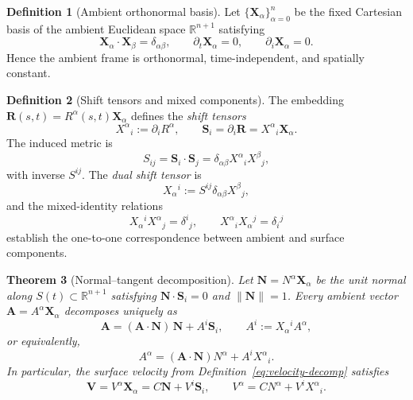 \documentclass[11pt]{article}
\theoremstyle{definition}
\newtheorem{definition}{Definition}[section]
\theoremstyle{plain}
\newtheorem{theorem}[definition]{Theorem}
\theoremstyle{remark}
\begin{document}
\begin{definition}[Ambient orthonormal basis]\label{def:ambient-basis}
Let $\{\mathbf{X}_{\alpha}\}_{\alpha=0}^{n}$ be the fixed Cartesian basis of the ambient Euclidean space $\mathbb{R}^{n+1}$ satisfying
\begin{equation}
\mathbf{X}_{\alpha} \cdot \mathbf{X}_{\beta}=\delta_{\alpha\beta},\qquad
\partial_t\mathbf{X}_{\alpha}=0,\qquad
\partial_i\mathbf{X}_{\alpha}=0.
\end{equation}
Hence the ambient frame is orthonormal, time-independent, and spatially constant.
\end{definition}

\begin{definition}[Shift tensors and mixed components]\label{def:shift-tensors}
The embedding $\mathbf{R}(s,t)=R^{\alpha}(s,t)\mathbf{X}_{\alpha}$ defines the \emph{shift tensors}
\begin{equation}
X^{\alpha}{}_{i}:=\partial_i R^{\alpha},
\qquad
\mathbf{S}_i=\partial_i\mathbf{R}=X^{\alpha}{}_{i}\mathbf{X}_{\alpha}.
\end{equation}
The induced metric is
\begin{equation} \label{eq:shift-tensors}
S_{ij}=\mathbf{S}_i\cdot\mathbf{S}_j
=\delta_{\alpha\beta}X^{\alpha}{}_{i}X^{\beta}{}_{j},
\end{equation}
with inverse $S^{ij}$.  
The \emph{dual shift tensor} is
\begin{equation}
X_{\alpha}{}^{i}:=S^{ij}\delta_{\alpha\beta}X^{\beta}{}_{j},
\end{equation}
and the mixed-identity relations
\begin{equation}
X_{\alpha}{}^{i}X^{\alpha}{}_{j}=\delta^{i}{}_{j},\qquad
X^{\alpha}{}_{i}X_{\alpha}{}^{j}=\delta_{i}{}^{j}
\end{equation}
establish the one-to-one correspondence between ambient and surface components.
\end{definition}

\begin{theorem}[Normal–tangent decomposition]\label{thm:normal-tangent-decomp}
Let $\mathbf{N}=N^{\alpha}\mathbf{X}_{\alpha}$ be the unit normal along $S(t)\subset\mathbb{R}^{n+1}$ satisfying $\mathbf{N}\!\cdot\!\mathbf{S}_i=0$ and $\|\mathbf{N}\|=1$.  
Every ambient vector $\mathbf{A}=A^{\alpha}\mathbf{X}_{\alpha}$ decomposes uniquely as
\[
\mathbf{A}=(\mathbf{A}\cdot\mathbf{N})\,\mathbf{N}+A^{i}\mathbf{S}_i,
\qquad
A^{i}:=X_{\alpha}{}^{i}A^{\alpha},
\]
or equivalently,
\[
A^{\alpha}=(\mathbf{A}\!\cdot\!\mathbf{N})N^{\alpha}+A^{i}X^{\alpha}{}_{i}.
\]
In particular, the surface velocity from Definition~\eqref{eq:velocity-decomp} satisfies
\[
\mathbf{V}=V^{\alpha}\mathbf{X}_{\alpha}=C\mathbf{N}+V^{i}\mathbf{S}_i,
\qquad
V^{\alpha}=C N^{\alpha}+V^{i}X^{\alpha}{}_{i}.
\]
\end{theorem}
\end{document}
